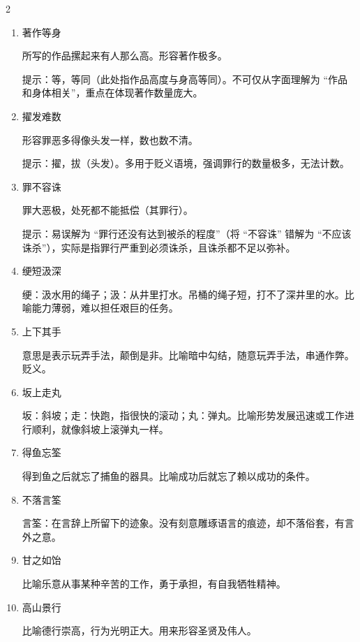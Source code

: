 \documentclass[final,oneside]{ctexbook}
\begin{document}
\begin{multicols}{2}
\begin{enumerate}
      提示：含贬义。常被误用形容一切 “吃香” 的事物（如热门商品、当红明星等），完全背离其本义。

    \item 著作等身

      所写的作品摞起来有人那么高。形容著作极多。

      提示：等，等同（此处指作品高度与身高等同）。不可仅从字面理解为 “作品和身体相关”，重点在体现著作数量庞大。

    \item 擢发难数

      形容罪恶多得像头发一样，数也数不清。

      提示：擢，拔（头发）。多用于贬义语境，强调罪行的数量极多，无法计数。

    \item 罪不容诛

      罪大恶极，处死都不能抵偿（其罪行）。

      提示：易误解为 “罪行还没有达到被杀的程度”（将 “不容诛” 错解为 “不应该诛杀”），实际是指罪行严重到必须诛杀，且诛杀都不足以弥补。

    \item 绠短汲深

      绠：汲水用的绳子；汲：从井里打水。吊桶的绳子短，打不了深井里的水。比喻能力薄弱，难以担任艰巨的任务。

    \item 上下其手

      意思是表示玩弄手法，颠倒是非。比喻暗中勾结，随意玩弄手法，串通作弊。贬义。

    \item 坂上走丸

      坂：斜坡；走：快跑，指很快的滚动；丸：弹丸。比喻形势发展迅速或工作进行顺利，就像斜坡上滚弹丸一样。

    \item 得鱼忘筌

      得到鱼之后就忘了捕鱼的器具。比喻成功后就忘了赖以成功的条件。

    \item 不落言筌

      言筌：在言辞上所留下的迹象。没有刻意雕琢语言的痕迹，却不落俗套，有言外之意。

    \item 甘之如饴

      比喻乐意从事某种辛苦的工作，勇于承担，有自我牺牲精神。

    \item 高山景行

      比喻德行崇高，行为光明正大。用来形容圣贤及伟人。


\end{enumerate}
\end{multicols}
\end{document}
